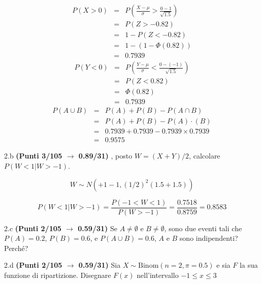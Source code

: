 \documentclass[
  11pt,
]{book}
\theoremstyle{mytheoremstyle}
\theoremstyle{mydefstyle}
\newenvironment{sol}
  {
  \begin{tcolorbox}[enhanced,breakable,arc=0.1mm,boxrule=1pt,colback=white,colframe=iblue,
  title=\bf \fontfamily{lmss}\selectfont \hspace{.5 cm} Soluzione,drop fuzzy shadow]

}{
\end{tcolorbox}
  }
\begin{document}
\begin{sol}
\begin{eqnarray*}
      P( X   >   0 ) 
        &=& P\left(  \frac { X  -  \mu }{ \sigma }  >  \frac { 0  -  1 }{\sqrt{ 1.5 }} \right)  \\
                 &=& P\left(  Z   >   -0.82 \right) \\    &=& 1-P(Z< -0.82 )\\ 
                 &=&  1-(1-\Phi( 0.82 )) \\ &=&  0.7939 
      \end{eqnarray*}\begin{eqnarray*}
      P( Y   <   0 ) 
        &=& P\left(  \frac { Y  -  \mu }{ \sigma }  <  \frac { 0  -  ( -1 ) }{\sqrt{ 1.5 }} \right)  \\
                 &=& P\left(  Z   <   0.82 \right) \\    
                 &=&  \Phi( 0.82 ) \\ &=&  0.7939 
      \end{eqnarray*}\begin{eqnarray}
      P( A \cup B ) &=& P( A )+P( B )-P( A \cap B ) \\
                         &=& P( A )+P( B )-P( A )\cdot ( B ) \\
                         &=&  0.7939 + 0.7939 - 0.7939 \times 0.7939  \\
                         &=&  0.9575 \end{eqnarray}

\end{sol}

2.b \textbf{(Punti 3/105 \(\rightarrow\) 0.89/31)} , posto \(W=(X+Y)/2\), calcolare \(P(W<1|W>-1)\).

\begin{sol}
\[
W\sim N(+1-1,(1/2)^2(1.5+1.5))
\]

\[ 
P(W<1|W>-1)=\frac{P(-1<W<1)}{P(W>-1)}=\frac{0.7518}{0.8759}=0.8583
\]

\end{sol}

2.c \textbf{(Punti 2/105 \(\rightarrow\) 0.59/31)} Se \(A\neq\emptyset\) e \(B\neq\emptyset\), sono due eventi tali che \(P(A)=0.2\), \(P(B)=0.6\), e \(P(A\cup B)=0.6\), \(A\) e \(B\) sono indipendenti? Perché?

2.d \textbf{(Punti 2/105 \(\rightarrow\) 0.59/31)} Sia \(X\sim\text{Binom}(n=2,\pi=0.5)\) e sia \(F\) la sua funzione di ripartizione. Disegnare \(F(x)\) nell'intervallo \(-1\leq x\leq 3\)
\end{document}
